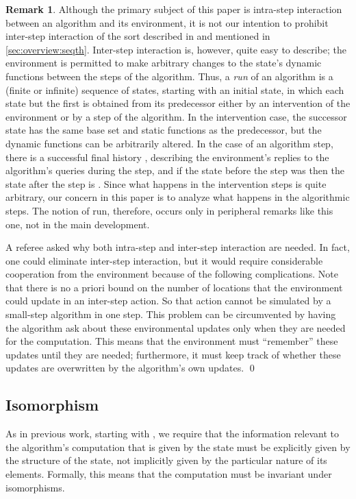 \documentclass{LMCS}
\theoremstyle{definition}
\newtheorem{rmk}[thm]{Remark}
\begin{document}
\begin{rmk}
  Although the primary subject of this paper is intra-step interaction
  between an algorithm and its environment, it is not our intention to
  prohibit inter-step interaction of the sort described in \cite{lipari}
  and mentioned in \ref{sec:overview:seqth}.  Inter-step interaction is,
  however, quite easy to describe; the environment is permitted to make
  arbitrary changes to the state's dynamic functions between the steps of
  the algorithm. Thus, a \emph{run} of an algorithm is a (finite or
  infinite) sequence of states, starting with an initial state, in which
  each state but the first is obtained from its predecessor either by an
  intervention of the environment or by a step of the algorithm.  In the
  intervention case, the successor state has the same base set and static
  functions as the predecessor, but the dynamic functions can be
  arbitrarily altered.  In the case of an algorithm step, there is a
  successful final history , describing the environment's replies to
  the algorithm's queries during the step, and if the state before the
  step was  then the state after the step is .  Since what
  happens in the intervention steps is quite arbitrary, our concern in
  this paper is to analyze what happens in the algorithmic steps.  The
  notion of run, therefore, occurs only in peripheral remarks like this
  one, not in the main development.

  A referee asked why both intra-step and inter-step interaction are
  needed.  In fact, one could eliminate inter-step interaction, but it
  would require considerable cooperation from the environment because
  of the following complications.  Note that there is no a priori
  bound on the number of locations that the environment could update
  in an inter-step action.  So that action cannot be simulated by a
  small-step algorithm in one step.  This problem can be circumvented
  by having the algorithm ask about these environmental updates only
  when they are needed for the computation.  This means that the
  environment must ``remember'' these updates until they are needed;
  furthermore, it must keep track of whether these updates are
  overwritten by the algorithm's own updates.  \qed\end{rmk}

\subsection{Isomorphism}

As in previous work, starting with \cite{seqth}, we require that the
information relevant to the algorithm's computation that is given by
the state must be explicitly given by the structure of the state, not
implicitly given by the particular nature of its elements.  Formally,
this means that the computation must be invariant under isomorphisms.
\end{document}
